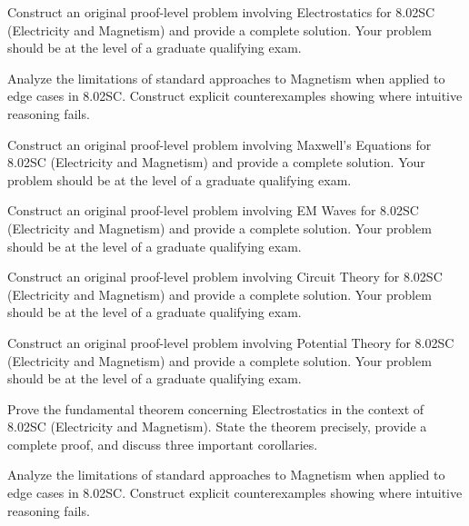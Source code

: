 \documentclass[12pt,a4paper]{exam}
\begin{document}
\begin{questions}

\question[2]
Construct an original proof-level problem involving Electrostatics for 8.02SC (Electricity and Magnetism) and provide a complete solution. Your problem should be at the level of a graduate qualifying exam.

\vspace{0.3cm}

\question[3]
Analyze the limitations of standard approaches to Magnetism when applied to edge cases in 8.02SC. Construct explicit counterexamples showing where intuitive reasoning fails.

\vspace{0.3cm}

\question[3]
Construct an original proof-level problem involving Maxwell's Equations for 8.02SC (Electricity and Magnetism) and provide a complete solution. Your problem should be at the level of a graduate qualifying exam.

\vspace{0.3cm}

\question[3]
Construct an original proof-level problem involving EM Waves for 8.02SC (Electricity and Magnetism) and provide a complete solution. Your problem should be at the level of a graduate qualifying exam.

\vspace{0.3cm}

\question[4]
Construct an original proof-level problem involving Circuit Theory for 8.02SC (Electricity and Magnetism) and provide a complete solution. Your problem should be at the level of a graduate qualifying exam.

\vspace{0.3cm}

\question[2]
Construct an original proof-level problem involving Potential Theory for 8.02SC (Electricity and Magnetism) and provide a complete solution. Your problem should be at the level of a graduate qualifying exam.

\vspace{0.3cm}

\question[5]
Prove the fundamental theorem concerning Electrostatics in the context of 8.02SC (Electricity and Magnetism). State the theorem precisely, provide a complete proof, and discuss three important corollaries.

\vspace{0.3cm}

\question[2]
Analyze the limitations of standard approaches to Magnetism when applied to edge cases in 8.02SC. Construct explicit counterexamples showing where intuitive reasoning fails.


\end{questions}
\end{document}
